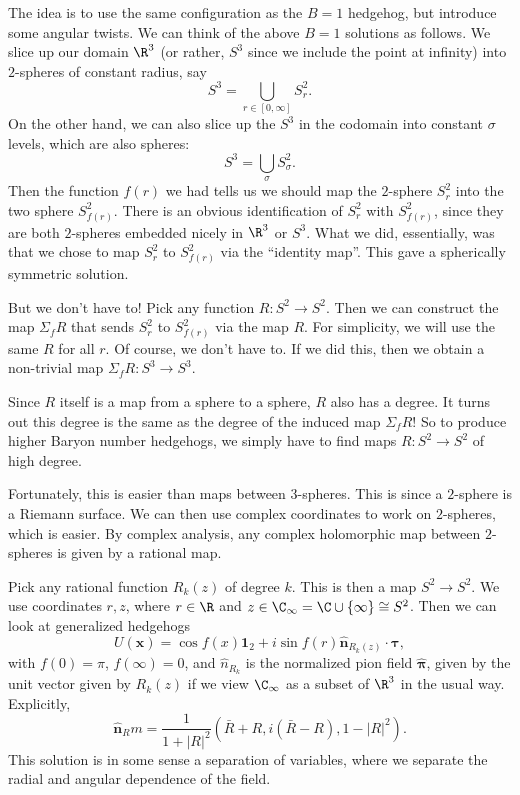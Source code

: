\documentclass[a4paper]{article}
\begin{document}
The idea is to use the same configuration as the $B = 1$ hedgehog, but introduce some angular twists. We can think of the above $B = 1$ solutions as follows. We slice up our domain $\R^3$ (or rather, $S^3$ since we include the point at infinity) into $2$-spheres of constant radius, say
\[
  S^3 = \bigcup_{r \in [0, \infty]} S_r^2.
\]
On the other hand, we can also slice up the $S^3$ in the codomain into constant $\sigma$ levels, which are also spheres:
\[
  S^3 = \bigcup_{\sigma} S_\sigma^2.
\]
Then the function $f(r)$ we had tells us we should map the $2$-sphere $S_r^2$ into the two sphere $S_{f(r)}^2$. There is an obvious identification of $S_r^2$ with $S_{f(r)}^2$, since they are both $2$-spheres embedded nicely in $\R^3$ or $S^3$. What we did, essentially, was that we chose to map $S_r^2$ to $S_{f(r)}^2$ via the ``identity map''. This gave a spherically symmetric solution.

But we don't have to! Pick any function $R: S^2 \to S^2$. Then we can construct the map $\Sigma_f R$ that sends $S_r^2$ to $S_{f(r)}^2$ via the map $R$. For simplicity, we will use the same $R$ for all $r$. Of course, we don't have to. If we did this, then we obtain a non-trivial map $\Sigma_f R: S^3 \to S^3$.

Since $R$ itself is a map from a sphere to a sphere, $R$ also has a degree. It turns out this degree is the same as the degree of the induced map $\Sigma_f R$! So to produce higher Baryon number hedgehogs, we simply have to find maps $R: S^2 \to S^2$ of high degree.

Fortunately, this is easier than maps between $3$-spheres. This is since a $2$-sphere is a Riemann surface. We can then use complex coordinates to work on $2$-spheres, which is easier. By complex analysis, any complex holomorphic map between $2$-spheres is given by a rational map.

Pick any rational function $R_k(z)$ of degree $k$. This is then a map $S^2 \to S^2$. We use coordinates $r, z$, where $r \in \R$ and $z \in \C_\infty = \C \cup \{\infty\} \cong S^2$. Then we can look at generalized hedgehogs
\[
  U(\mathbf{x}) = \cos f(x) \mathbf{1}_2 + i \sin f(r) \hat{\mathbf{n}}_{R_k(z)} \cdot \boldsymbol\tau,
\]
with $f(0) = \pi$, $f(\infty) = 0$, and $\hat{n}_{R_k}$ is the normalized pion field $\hat{\boldsymbol\pi}$, given by the unit vector given by $R_k(z)$ if we view $\C_\infty$ as a subset of $\R^3$ in the usual way. Explicitly,
\[
  \hat{\mathbf{n}}_R m = \frac{1}{1 + |R|^2} (\bar{R} + R, i (\bar{R} - R), 1 - |R|^2).
\]
This solution is in some sense a separation of variables, where we separate the radial and angular dependence of the field.
\end{document}
